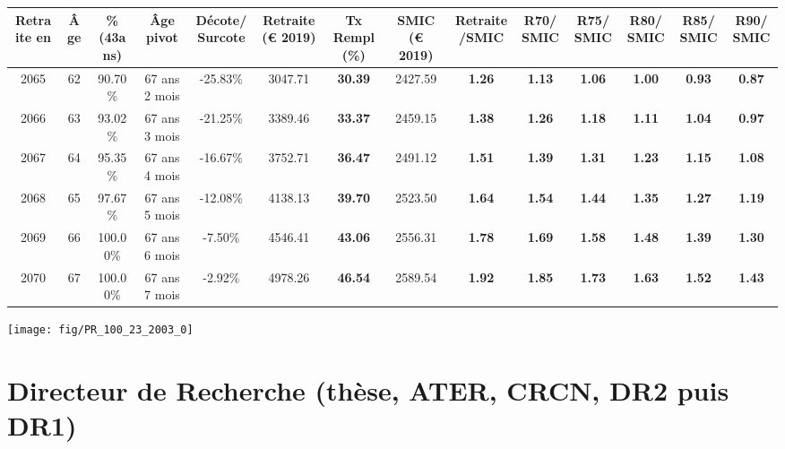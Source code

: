 \begin{adjustbox}{max width=\textwidth} 
\begin{tabular}[htb]{|c|c||c|c|c||c|c||c|c||c|c|c|c|c|} 
\hline 
 Retraite en &  Âge &  \%(43ans) &  Âge pivot &  Décote/Surcote &  Retraite (\euro{} 2019) &  Tx Rempl(\%) &  SMIC (\euro{} 2019) &  Retraite/SMIC &  R70/SMIC &  R75/SMIC &  R80/SMIC &  R85/SMIC &  R90/SMIC \\ 
\hline \hline 
 2065 &  62 &  90.70\% &  67 ans 2 mois &  -25.83\% &  3047.71 &  {\bf 30.39} &  2427.59 &  {\bf 1.26} &  {\bf 1.13} &  {\bf 1.06} &  {\bf {\color{red} 1.00}} &  {\bf {\color{red} 0.93}} &  {\bf {\color{red} 0.87}} \\ 
\hline 
 2066 &  63 &  93.02\% &  67 ans 3 mois &  -21.25\% &  3389.46 &  {\bf 33.37} &  2459.15 &  {\bf 1.38} &  {\bf 1.26} &  {\bf 1.18} &  {\bf 1.11} &  {\bf 1.04} &  {\bf {\color{red} 0.97}} \\ 
\hline 
 2067 &  64 &  95.35\% &  67 ans 4 mois &  -16.67\% &  3752.71 &  {\bf 36.47} &  2491.12 &  {\bf 1.51} &  {\bf 1.39} &  {\bf 1.31} &  {\bf 1.23} &  {\bf 1.15} &  {\bf 1.08} \\ 
\hline 
 2068 &  65 &  97.67\% &  67 ans 5 mois &  -12.08\% &  4138.13 &  {\bf 39.70} &  2523.50 &  {\bf 1.64} &  {\bf 1.54} &  {\bf 1.44} &  {\bf 1.35} &  {\bf 1.27} &  {\bf 1.19} \\ 
\hline 
 2069 &  66 &  100.00\% &  67 ans 6 mois &  -7.50\% &  4546.41 &  {\bf 43.06} &  2556.31 &  {\bf 1.78} &  {\bf 1.69} &  {\bf 1.58} &  {\bf 1.48} &  {\bf 1.39} &  {\bf 1.30} \\ 
\hline 
 2070 &  67 &  100.00\% &  67 ans 7 mois &  -2.92\% &  4978.26 &  {\bf 46.54} &  2589.54 &  {\bf 1.92} &  {\bf 1.85} &  {\bf 1.73} &  {\bf 1.63} &  {\bf 1.52} &  {\bf 1.43} \\ 
\hline 
\hline 
\end{tabular} 
\end{adjustbox} 
 
 \vspace{0.1cm} 

 {\hspace{-2.2cm}\texttt{[image: fig/PR\_100\_23\_2003\_0]}} 

\newpage 
 
\chapter{Directeur de Recherche (thèse, ATER, CRCN, DR2 puis DR1)} 

